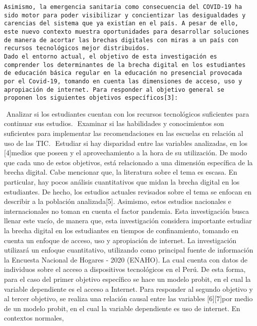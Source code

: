 \begin{enumerate}
\begin{verbatim}
Asimismo, la emergencia sanitaria como consecuencia del COVID-19 ha sido motor para poder visibilizar y concientizar las desigualdades y carencias del sistema que ya existían en el país. A pesar de ello, este nuevo contexto muestra oportunidades para desarrollar soluciones de manera de acortar las brechas digitales con miras a un país con recursos tecnológicos mejor distribuidos. 
Dado el entorno actual, el objetivo de esta investigación es comprender los determinantes de la brecha digital en los estudiantes de educación básica regular en la educación no presencial provocada por el Covid-19, tomando en cuenta las dimensiones de acceso, uso y apropiación de internet. Para responder al objetivo general se proponen los siguientes objetivos específicos[3]:
\end{verbatim}

   Analizar si los estudiantes cuentan con los recursos tecnológicos
  suficientes para continuar sus estudios.  Examinar si las habilidades
  y conocimientos son suficientes para implementar las recomendaciones
  en las escuelas en relación al uso de las TIC.  Estudiar si hay
  disparidad entre las variables analizadas, en los {[}4{]}medios que
  poseen y el aprovechamiento a la hora de su utilización. De modo que
  cada uno de estos objetivos, está relacionado a una dimensión
  específica de la brecha digital. Cabe mencionar que, la literatura
  sobre el tema es escasa. En particular, hay pocos análisis
  cuantitativos que midan la brecha digital en los estudiantes. De
  hecho, los estudios actuales revisados sobre el tema se enfocan en
  describir a la población analizada{[}5{]}. Asimismo, estos estudios
  nacionales e internacionales no toman en cuenta el factor pandemia.
  Esta investigación busca llenar este vacío, de manera que, esta
  investigación considera importante estudiar la brecha digital en los
  estudiantes en tiempos de confinamiento, tomando en cuenta un enfoque
  de acceso, uso y apropiación de internet. La investigación utilizará
  un enfoque cuantitativo, utilizando como principal fuente de
  información la Encuesta Nacional de Hogares - 2020 (ENAHO). La cual
  cuenta con datos de individuos sobre el acceso a dispositivos
  tecnológicos en el Perú. De esta forma, para el caso del primer
  objetivo específico se hace un modelo probit, en el cual la variable
  dependiente es el acceso a Internet. Para responder al segundo
  objetivo y al tercer objetivo, se realiza una relación causal entre
  las variables {[}6{]}{[}7{]}por medio de un modelo probit, en el cual
  la variable dependiente es uso de internet. En contextos normales,

\end{enumerate}

